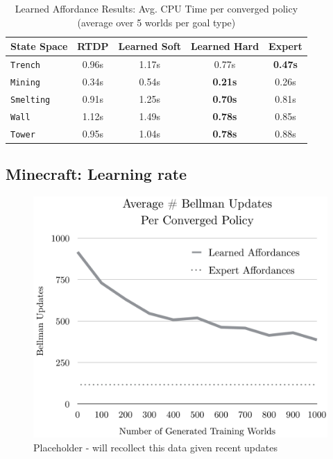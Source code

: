 \documentclass[conference]{IEEEtran}
\begin{document}
\begin{table}[H]
\centering
\begin{tabular}{ l || c c c c }
  State Space & RTDP & Learned Soft & Learned Hard & Expert 	 	\\ \hline
  \texttt{Trench}  	& 	0.96s	&	1.17s		&	0.77s	&	{\bf 0.47s}	\\
  \texttt{Mining}  	& 	0.34s	&	0.54s		&	{\bf 0.21s}	&	0.26s  \\
  \texttt{Smelting}  	& 	0.91s	&	1.25s		&	{\bf 0.70s}	&	0.81s  \\
  \texttt{Wall}  		& 	1.12s	&	1.49s		&	{\bf 0.78s}	&	0.85s\\
  \texttt{Tower}  		& 	0.95s	&	1.04s		&	{\bf 0.78s}	&	0.88s \\
\end{tabular}
\caption{Learned Affordance Results: Avg. CPU Time per converged policy (average over 5 worlds per goal type)}
\label{table:minecraft_results_bellman}
\end{table}

\subsection{Minecraft: Learning rate}

\begin{figure}[H]
\centering
\includegraphics[scale=0.195]{figures/training_results.png}%
  \caption{Placeholder - will recollect this data given recent updates}
  \label{fig:training_results}
\end{figure}
\end{document}

